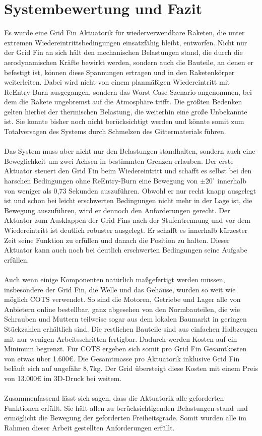 \section{Systembewertung und Fazit}
Es wurde eine Grid Fin Aktuatorik für wiederverwendbare Raketen, die unter extremen Wiedereintrittsbedingungen einsatzfähig bleibt, entworfen. Nicht nur der Grid Fin an sich hält den mechanischen Belastungen stand, die durch die aerodynamischen Kräfte bewirkt werden, sondern auch die Bauteile, an denen er befestigt ist, können diese Spannungen ertragen und in den Raketenkörper weiterleiten. Dabei wird nicht von einem planmäßigen Wiedereintritt mit ReEntry-Burn ausgegangen, sondern das Worst-Case-Szenario angenommen, bei dem die Rakete ungebremst auf die Atmosphäre trifft. Die größten Bedenken gelten hierbei der thermischen Belastung, die weiterhin eine große Unbekannte ist. Sie konnte bisher noch nicht berücksichtigt werden und könnte somit zum Totalversagen des Systems durch Schmelzen des Gittermaterials führen.
\\~\\
Das System muss aber nicht nur den Belastungen standhalten, sondern auch eine Beweglichkeit um zwei Achsen in bestimmten Grenzen erlauben. Der erste Aktuator steuert den Grid Fin beim Wiedereintritt und schafft es selbst bei den harschen Bedingungen ohne ReEntry-Burn eine Bewegung von $\pm 20^\circ$  innerhalb von weniger als 0,73 Sekunden auszuführen. Obwohl er nur recht knapp ausgelegt ist und schon bei leicht erschwerten Bedingungen nicht mehr in der Lage ist, die Bewegung auszuführen, wird er dennoch den Anforderungen gerecht. Der Aktuator zum Ausklappen der Grid Fins nach der Stufentrennung und vor dem Wiedereintritt ist deutlich robuster ausgelegt. Er schafft es innerhalb kürzester Zeit seine Funktion zu erfüllen und danach die Position zu halten. Dieser Aktuator kann auch noch bei deutlich erschwerten Bedingungen seine Aufgabe erfüllen.
\\~\\
Auch wenn einige Komponenten natürlich maßgefertigt werden müssen, insbesondere der Grid Fin, die Welle und das Gehäuse, wurden so weit wie möglich COTS verwendet. So sind die Motoren, Getriebe und Lager alle von Anbietern online bestellbar, ganz abgesehen von den Normbauteilen, die wie Schrauben und Muttern teilweise sogar aus dem lokalen Baumarkt in geringen Stückzahlen erhältlich sind. Die restlichen Bauteile sind aus einfachen Halbzeugen mit nur wenigen Arbeitsschritten fertigbar. Dadurch werden Kosten auf ein Minimum begrenzt. Für COTS ergeben sich somit pro Grid Fin Gesamtkosten von etwas über 1.600€. Die Gesamtmasse pro Aktuatorik inklusive Grid Fin beläuft sich auf ungefähr $8,7$kg. Der Grid übersteigt diese Kosten mit einem Preis von 13.000€ im 3D-Druck bei weitem.
\\~\\
Zusammenfassend lässt sich sagen, dass die Aktuatorik alle geforderten Funktionen erfüllt. Sie hält allen zu berücksichtigenden Belastungen stand und ermöglicht die Bewegung der geforderten Freiheitsgrade. Somit wurden alle im Rahmen dieser Arbeit gestellten Anforderungen erfüllt.
